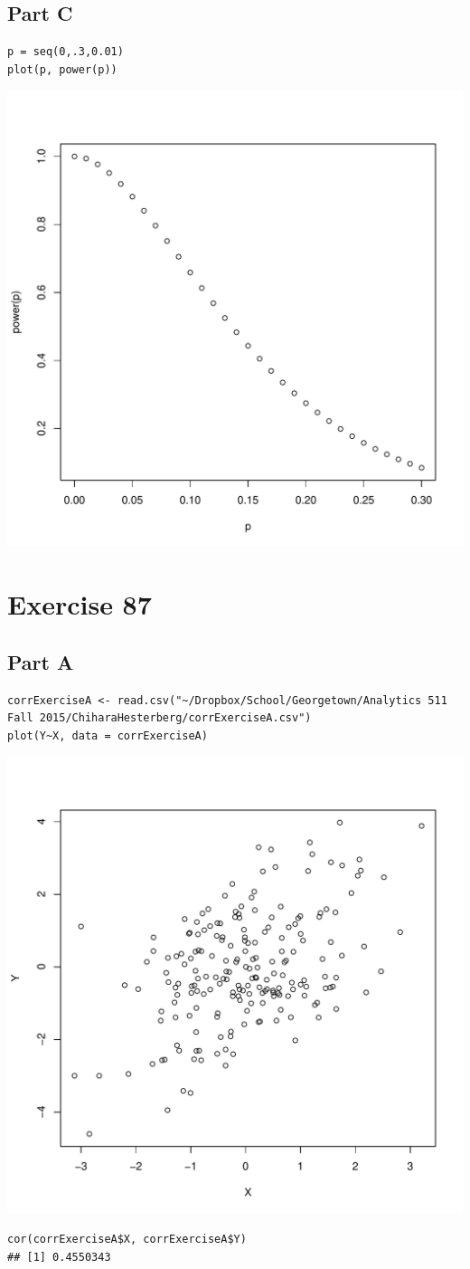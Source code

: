 \documentclass{article}\usepackage[]{graphicx}\usepackage[]{color}
\makeatletter
\newenvironment{kframe}{%
 \def\at@end@of@kframe{}%
 \ifinner\ifhmode%
  \def\at@end@of@kframe{\end{minipage}}%
  \begin{minipage}{\columnwidth}%
 \fi\fi%
 \def\FrameCommand##1{\hskip\@totalleftmargin \hskip-\fboxsep
 \colorbox{shadecolor}{##1}\hskip-\fboxsep
     \hskip-\linewidth \hskip-\@totalleftmargin \hskip\columnwidth}%
 \MakeFramed {\advance\hsize-\width
   \@totalleftmargin\z@ \linewidth\hsize
   \@setminipage}}%
 {\par\unskip\endMakeFramed%
 \at@end@of@kframe}
\newenvironment{knitrout}{}{} %
\makeatother
\begin{document}
\subsection*{Part C}
\begin{knitrout}
\color{fgcolor}\begin{kframe}
\begin{verbatim}
p = seq(0,.3,0.01)
plot(p, power(p))
\end{verbatim}
\end{kframe}
\includegraphics[width=0.33\linewidth]{figure/unnamed-chunk-15-1} 

\end{knitrout}

\section*{Exercise 87}
\subsection*{Part A}
\begin{knitrout}
\color{fgcolor}\begin{kframe}
\begin{verbatim}
corrExerciseA <- read.csv("~/Dropbox/School/Georgetown/Analytics 511 Fall 2015/ChiharaHesterberg/corrExerciseA.csv")
plot(Y~X, data = corrExerciseA)
\end{verbatim}
\end{kframe}
\includegraphics[width=0.33\linewidth]{figure/unnamed-chunk-16-1} 
\begin{kframe}\begin{verbatim}
cor(corrExerciseA$X, corrExerciseA$Y)
## [1] 0.4550343
\end{verbatim}
\end{kframe}
\end{knitrout}
\end{document}

